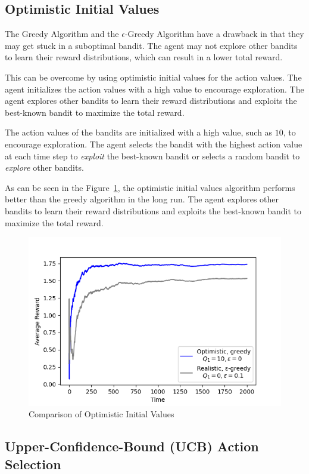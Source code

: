 \subsection{Optimistic Initial Values}

The Greedy Algorithm and the $\epsilon$-Greedy Algorithm have a drawback in that they may get stuck in a suboptimal bandit. The agent may not explore other bandits to learn their reward distributions, which can result in a lower total reward.

This can be overcome by using optimistic initial values for the action values. The agent initializes the action values with a high value to encourage exploration. The agent explores other bandits to learn their reward distributions and exploits the best-known bandit to maximize the total reward.

The action values of the bandits are initialized with a high value, such as $10$, to encourage exploration. The agent selects the bandit with the highest action value at each time step to \textit{exploit} the best-known bandit or selects a random bandit to \textit{explore} other bandits.

As can be seen in the Figure~\ref{fig:optimistic_greedy}, the optimistic initial values algorithm performs better than the greedy algorithm in the long run. The agent explores other bandits to learn their reward distributions and exploits the best-known bandit to maximize the total reward.

\begin{figure}[h!]
    \centering
    \includegraphics[width=0.75\linewidth]{images/optimistic.png}
    \caption{Comparison of Optimistic Initial Values}
    \label{fig:optimistic_greedy}
\end{figure}

\subsection{Upper-Confidence-Bound (UCB) Action Selection}

